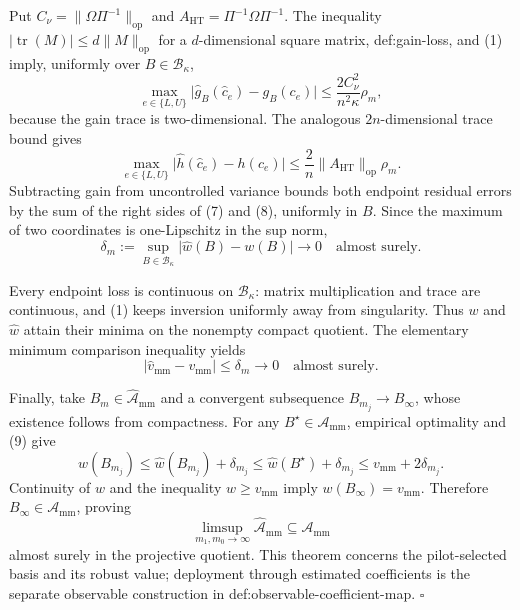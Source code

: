 Put \(C_\nu=\lVert\Omega\Pi^{-1}\rVert_{\mathrm{op}}\) and \(A_{\mathrm{HT}}=\Pi^{-1}\Omega\Pi^{-1}\).  The inequality \(\lvert\operatorname{tr}(M)\rvert\le d\lVert M\rVert_{\mathrm{op}}\) for a \(d\)-dimensional square matrix, def:gain-loss, and (1) imply, uniformly over \(B\in\mathcal B_\kappa\),
\[
 \max_{e\in\{L,U\}}
 \lvert\widehat g_B(\widehat c_e)-g_B(c_e)\rvert
 \le\frac{2C_\nu^2}{n^2\kappa}\rho_m,
 \tag{7}
\]
because the gain trace is two-dimensional.  The analogous \(2n\)-dimensional trace bound gives
\[
 \max_{e\in\{L,U\}}
 \lvert\widehat h(\widehat c_e)-h(c_e)\rvert
 \le\frac{2}{n}\lVert A_{\mathrm{HT}}\rVert_{\mathrm{op}}\rho_m.
 \tag{8}
\]
Subtracting gain from uncontrolled variance bounds both endpoint residual errors by the sum of the right sides of (7) and (8), uniformly in \(B\).  Since the maximum of two coordinates is one-Lipschitz in the sup norm,
\[
 \delta_m:=\sup_{B\in\mathcal B_\kappa}
 \lvert\widehat w(B)-w(B)\rvert
 \longrightarrow0
 \quad\text{almost surely}.
 \tag{9}
\]

Every endpoint loss is continuous on \(\mathcal B_\kappa\): matrix multiplication and trace are continuous, and (1) keeps inversion uniformly away from singularity.  Thus \(w\) and \(\widehat w\) attain their minima on the nonempty compact quotient.  The elementary minimum comparison inequality yields
\[
 \lvert\widehat v_{\mathrm{mm}}-v_{\mathrm{mm}}\rvert
 \le\delta_m\longrightarrow0
 \quad\text{almost surely}.
 \tag{10}
\]

Finally, take \(B_m\in\widehat{\mathcal A}_{\mathrm{mm}}\) and a convergent subsequence \(B_{m_j}\to B_\infty\), whose existence follows from compactness.  For any \(B^\star\in\mathcal A_{\mathrm{mm}}\), empirical optimality and (9) give
\[
 w(B_{m_j})
 \le\widehat w(B_{m_j})+\delta_{m_j}
 \le\widehat w(B^\star)+\delta_{m_j}
 \le v_{\mathrm{mm}}+2\delta_{m_j}.
 \tag{11}
\]
Continuity of \(w\) and the inequality \(w\ge v_{\mathrm{mm}}\) imply \(w(B_\infty)=v_{\mathrm{mm}}\).  Therefore \(B_\infty\in\mathcal A_{\mathrm{mm}}\), proving
\[
 \limsup_{m_1,m_0\to\infty}\widehat{\mathcal A}_{\mathrm{mm}}
 \subseteq\mathcal A_{\mathrm{mm}}
\]
almost surely in the projective quotient.  This theorem concerns the pilot-selected basis and its robust value; deployment through estimated coefficients is the separate observable construction in def:observable-coefficient-map. \(\square\)